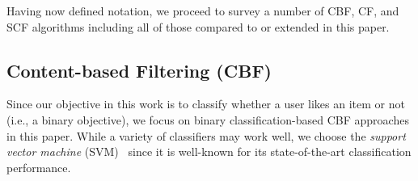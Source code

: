 %
%

Having now defined notation, we proceed to survey a number of 
CBF, CF, and SCF algorithms including all of those 
compared to or extended in this paper.

\subsection{Content-based Filtering (CBF)}

\label{sec:cbf}

Since our objective in this work is to classify whether a user likes
an item or not (i.e., a binary objective), we focus on binary
classification-based CBF approaches in this paper.  While a variety of
classifiers may work well, we choose the
\emph{support vector machine} (SVM)~\cite{svm} since it is
well-known for its state-of-the-art classification performance.

